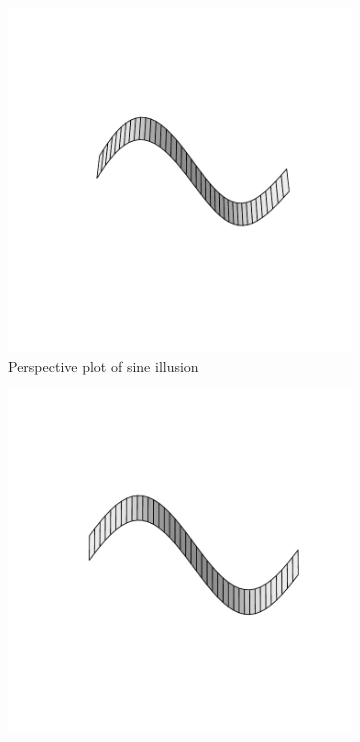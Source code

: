 \documentclass[11pt]{isuthesis}\usepackage[]{graphicx}\usepackage[]{color}
\begin{document}
\begin{figure}[h!tbp]\centering

\begin{subfigure}[t]{.49\textwidth}\centering
\includegraphics[width=\textwidth, keepaspectratio=TRUE, trim=0in 1.5in 0in 1.5in]{fig-ribbon-illusion1}
\caption{Perspective plot of sine illusion\label{ribbon1}}
\end{subfigure}
\begin{subfigure}[t]{.49\textwidth}\centering
\includegraphics[width=\textwidth, keepaspectratio=TRUE, trim=0in 1.5in 0in 1.5in]{fig-ribbon-illusion2}

\end{subfigure}
\end{figure}
\end{document}
